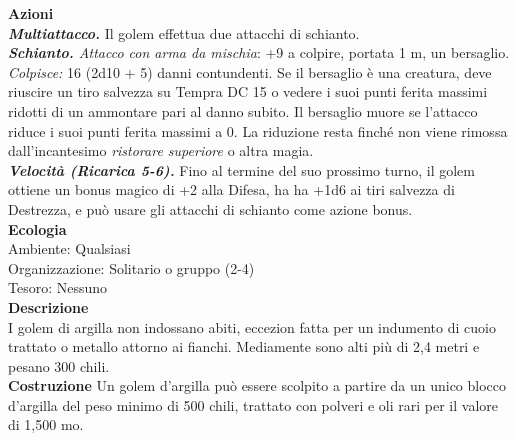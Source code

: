 \begin{multicols}{2}
\smallskip\textbf{Azioni} \\
\emph{\textbf{Multiattacco.}} Il golem effettua due attacchi di schianto.\\
\emph{\textbf{Schianto.} Attacco con arma da mischia}: +9 a colpire, portata 1 m, un bersaglio.\\
\emph{Colpisce:} 16 (2d10 + 5) danni contundenti. Se il bersaglio è una creatura, deve riuscire un tiro salvezza su Tempra DC 15 o vedere i suoi punti ferita massimi ridotti di un ammontare pari al danno subito. Il bersaglio muore se l'attacco riduce i suoi punti ferita massimi a 0. La riduzione resta finché non viene rimossa dall'incantesimo \emph{ristorare superiore} o altra magia.\\
\emph{\textbf{Velocità (Ricarica 5-6).}} Fino al termine del suo prossimo turno, il golem ottiene un bonus magico di +2 alla Difesa, ha ha +1d6 ai tiri salvezza di Destrezza, e può usare gli attacchi di schianto come azione bonus.\\
\textbf{Ecologia}\\
Ambiente: Qualsiasi\\
Organizzazione: Solitario o gruppo (2-4)\\
Tesoro: Nessuno\\
\textbf{Descrizione}\\
I golem di argilla non indossano abiti, eccezion fatta per un indumento di cuoio trattato o metallo attorno ai fianchi. Mediamente sono alti più di 2,4 metri e pesano 300 chili.\\
\textbf{Costruzione}
Un golem d'argilla può essere scolpito a partire da un unico blocco d'argilla del peso minimo di 500 chili, trattato con polveri e oli rari per il valore di 1,500 mo.\\


\end{multicols}
